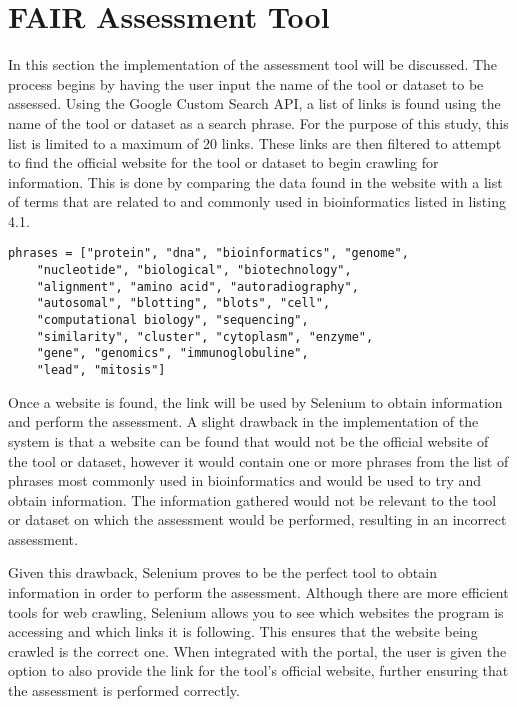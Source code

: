 \documentclass{cisfyp}
\begin{document}
\section{FAIR Assessment Tool}
In this section the implementation of the assessment tool will be discussed. The process begins by having the user input the name of the tool or dataset to be assessed. Using the Google Custom Search API, a list of links is found using the name of the tool or dataset as a search phrase. For the purpose of this study, this list is limited to a maximum of 20 links. These links are then filtered to attempt to find the official website for the tool or dataset to begin crawling for information. This is done by comparing the data found in the website with a list of terms that are related to and commonly used in bioinformatics listed in listing 4.1.
\begin{lstlisting}[frame = single, caption={List of most commonly used phrases in bioinformatics.}, captionpos=b]
phrases = ["protein", "dna", "bioinformatics", "genome", 
	"nucleotide", "biological", "biotechnology", 
	"alignment", "amino acid", "autoradiography", 
	"autosomal", "blotting", "blots", "cell", 
	"computational biology", "sequencing", 
	"similarity", "cluster", "cytoplasm", "enzyme",
	"gene", "genomics", "immunoglobuline", 
	"lead", "mitosis"]
\end{lstlisting}
Once a website is found, the link will be used by Selenium to obtain information and perform the assessment. A slight drawback in the implementation of the system is that a website can be found that would not be the official website of the tool or dataset, however it would contain one or more phrases from the list of phrases most commonly used in bioinformatics and would be used to try and obtain information. The information gathered would not be relevant to the tool or dataset on which the assessment would be performed, resulting in an incorrect assessment.

Given this drawback, Selenium proves to be the perfect tool to obtain information in order to perform the assessment. Although there are more efficient tools for web crawling, Selenium allows you to see which websites the program is accessing and which links it is following. This ensures that the website being crawled is the correct one.
When integrated with the portal, the user is given the option to also provide the link for the tool's official website, further ensuring that the assessment is performed correctly.
\end{document}
